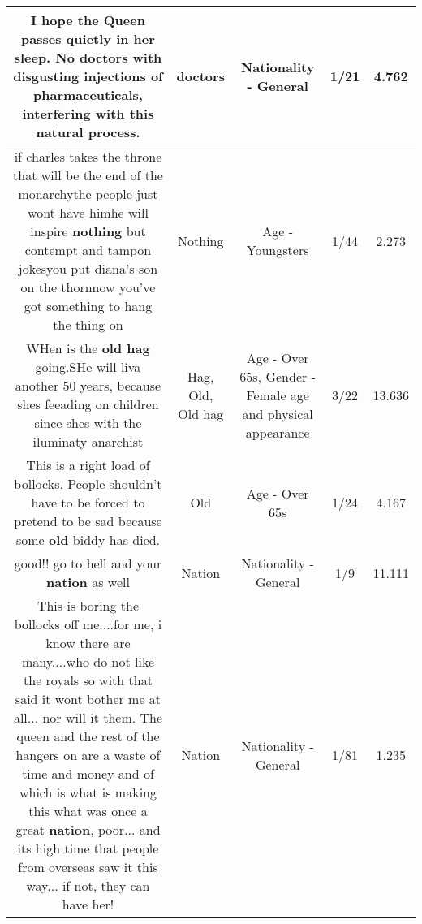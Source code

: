 \documentclass[11pt]{article}
\newlength\mylength
\begin{document}
\begin{center}
\begin{longtable}{|C{.65\mylength}|C{.30\mylength}|C{.12\mylength}|C{.12\mylength}|C{.12\mylength}|}
  \small I hope the Queen passes quietly in her sleep. No \textbf{doctors} with disgusting injections of pharmaceuticals, interfering with this natural process.\normalsize   & doctors & Nationality - General & 1/21 & 4.762 \\  \hline
  \small if charles takes the throne that will be the end of the monarchythe people just wont have himhe will inspire \textbf{nothing} but contempt and tampon jokesyou put diana's son on the thornnow you've got something to hang the thing on\normalsize   & Nothing & Age - Youngsters & 1/44 & 2.273 \\  \hline
  \small WHen is the \textbf{o\textbf{ld} h\textbf{ag}} going.SHe will liva another 50 years, because shes feeading on children since shes with the iluminaty anarchist\normalsize   & Hag, Old, Old hag & Age - Over 65s, Gender - Female age and physical appearance & 3/22 & 13.636 \\  \hline
  \small This is a right load of bollocks. People shouldn't have to be forced to pretend to be sad because some \textbf{old} biddy has died.\normalsize   & Old & Age - Over 65s & 1/24 & 4.167 \\  \hline
  \small good!! go to hell and your \textbf{nation} as well\normalsize   & Nation & Nationality - General & 1/9 & 11.111 \\  \hline
  \small This is  boring the bollocks off me....for me, i know there are many....who do not like the royals so with that said it wont bother me at all... nor will it them. The queen and the rest of the hangers on are a waste of time and money and of which is what is making this what was once a great \textbf{nation}, poor... and its high time that people from overseas saw it this way... if not, they can have her!\normalsize   & Nation & Nationality - General & 1/81 & 1.235 \\  \hline

\end{longtable}
\end{center}
\end{document}
